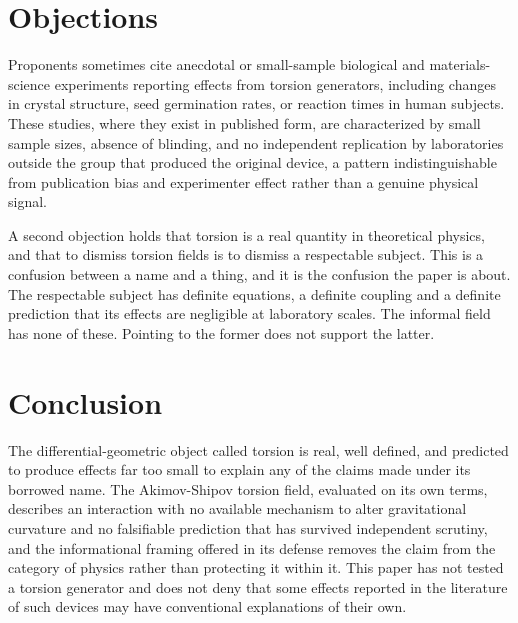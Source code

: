 \documentclass[11pt]{article}
\begin{document}
\section{Objections}

Proponents sometimes cite anecdotal or small-sample biological and materials-science experiments reporting effects from torsion generators, including changes in crystal structure, seed germination rates, or reaction times in human subjects. These studies, where they exist in published form, are characterized by small sample sizes, absence of blinding, and no independent replication by laboratories outside the group that produced the original device, a pattern indistinguishable from publication bias and experimenter effect rather than a genuine physical signal.

A second objection holds that torsion is a real quantity in theoretical physics, and that to dismiss torsion fields is to dismiss a respectable subject. This is a confusion between a name and a thing, and it is the confusion the paper is about. The respectable subject has definite equations, a definite coupling and a definite prediction that its effects are negligible at laboratory scales. The informal field has none of these. Pointing to the former does not support the latter.

\section{Conclusion}

The differential-geometric object called torsion is real, well defined, and predicted to produce effects far too small to explain any of the claims made under its borrowed name. The Akimov-Shipov torsion field, evaluated on its own terms, describes an interaction with no available mechanism to alter gravitational curvature and no falsifiable prediction that has survived independent scrutiny, and the informational framing offered in its defense removes the claim from the category of physics rather than protecting it within it. This paper has not tested a torsion generator and does not deny that some effects reported in the literature of such devices may have conventional explanations of their own.
\end{document}

